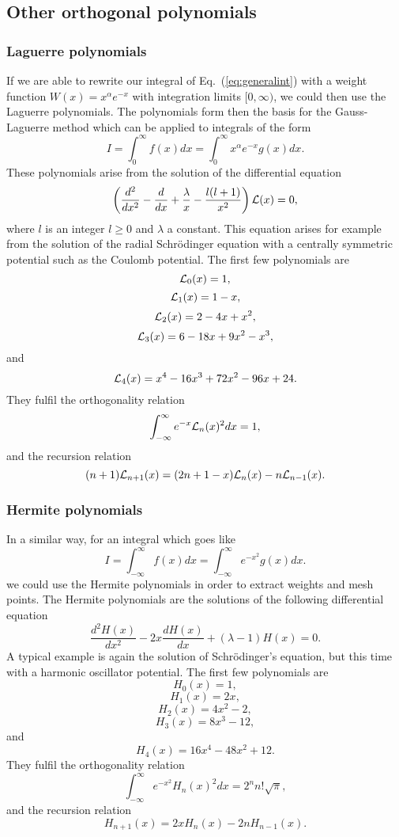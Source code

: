 \subsection{Other orthogonal polynomials}

\subsubsection{Laguerre polynomials}
If we are able to rewrite our integral of Eq.\ (\ref{eq:generalint}) with a
weight function $W(x)=x^{\alpha}e^{-x}$ with integration limits 
$[0,\infty)$, we could then use the Laguerre polynomials.
The polynomials form then the basis for the Gauss-Laguerre method which can be applied
to integrals of the form
\[ 
   I=\int_0^{\infty}f(x)dx =\int_0^{\infty}x^{\alpha}e^{-x}g(x)dx.
\]
These polynomials arise from the solution of the differential
equation
\[
\left(\frac{d^2 }{dx^2}-\frac{d }{dx}+\frac{\lambda}{x}-\frac{l(l+1)}{x^2}\right){\cal L}(x)=0,
\]
where $l$ is an integer $l\ge 0$ and $\lambda$ a constant. This equation
arises for example from the solution of the radial Schr\"odinger equation with 
a centrally symmetric potential such as the Coulomb potential.
The first few polynomials are
\[
   {\cal L}_0(x)=1,
\]
\[
    {\cal L}_1(x)=1-x,
\]
\[
    {\cal L}_2(x)=2-4x+x^2,
\]
\[
    {\cal L}_3(x)=6-18x+9x^2-x^3,
\]
and
\[
    {\cal L}_4(x)=x^4-16x^3+72x^2-96x+24.
\]
They fulfil the orthogonality relation
\[
  \int_{-\infty}^{\infty}e^{-x}{\cal L}_n(x)^2dx=1,
\]
and the recursion relation
\[
  (n+1){\cal L}_{n+1}(x)=(2n+1-x){\cal L}_{n}(x)-n{\cal L}_{n-1}(x).
\]

\subsubsection{Hermite polynomials}

In a similar way, for an integral which goes like
\[ 
   I=\int_{-\infty}^{\infty}f(x)dx =\int_{-\infty}^{\infty}e^{-x^2}g(x)dx.
\]
we could use the Hermite polynomials in order to extract weights and mesh points.
The Hermite polynomials are the solutions of the following differential
equation
\[
   \frac{d^2H(x)}{dx^2}-2x\frac{dH(x)}{dx}+
       (\lambda-1)H(x)=0.
\]
A typical example is again the solution of Schr\"odinger's
equation, but this time with a harmonic oscillator potential.
The first few polynomials are
\[
   H_0(x)=1,
\]
\[
    H_1(x)=2x,
\]
\[
    H_2(x)=4x^2-2,
\]
\[
    H_3(x)=8x^3-12,
\]
and
\[
    H_4(x)=16x^4-48x^2+12.
\]
They fulfil the orthogonality relation
\[
  \int_{-\infty}^{\infty}e^{-x^2}H_n(x)^2dx=2^nn!\sqrt{\pi},
\]
and the recursion relation
\[
  H_{n+1}(x)=2xH_{n}(x)-2nH_{n-1}(x).
\]




